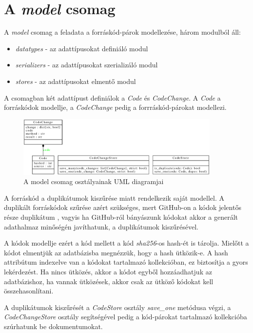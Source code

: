 \section{A \emph{model} csomag}

A \emph{model} csomag a feladata a forráskód-párok modellezése, három modulból áll:

\begin{itemize}
	\item \emph{datatypes} - az adattípusokat definiáló modul
	\item \emph{serializers} - az adattípusokat szerializáló modul
	\item \emph{stores} - az adattípusokat elmentő modul
\end{itemize}

A csomagban két adattípust definiálok a \emph{Code} és \emph{CodeChange}.
A \emph{Code} a forráskódok modellje, a \emph{CodeChange} pedig a forrráskód-párokat modellezi.

\begin{figure}[H]
	\centering
	\includegraphics[width=0.9\textwidth]{images/uml/models.eps}
	\caption{A model csomag osztályainak UML diagramjai}
\end{figure}

A forráskód a duplikátumok kiszűrése miatt rendelkezik saját modellel.
A duplikált forráskódok szűrése azért szükséges, mert GitHub-on a kódok jelentős része duplikátum
\cite{gitubDuplication},
vagyis ha GitHub-ról bányászunk kódokat akkor a generált adathalmaz minőségén javíthatunk,
a duplikátumok kiszűrésével.

A kódok modellje ezért a kód mellett a kód \emph{sha256}-os hash-ét is tárolja.
Mielőtt a kódot elmentjük az adatbázisba megnézzük, hogy a hash ütközik-e.
A hash attribútum indexelve van a kódokat tartalmazó kollekcióban, ez biztosítja a gyors lekérdezést.
Ha nincs ütközés, akkor a kódot egyből hozzáadhatjuk az adatbázishoz,
ha vannak ütközések, akkor csak az ütköző kódokat kell összehasonlítani.

A duplikátumok kiszűrését a \emph{CodeStore} osztály \emph{save\_one} metódusa végzi,
a \emph{CodeChangeStore} osztály segítségével pedig a kód-párokat tartalmazó kollekcióba
szúrhatunk be dokumentumokat.

